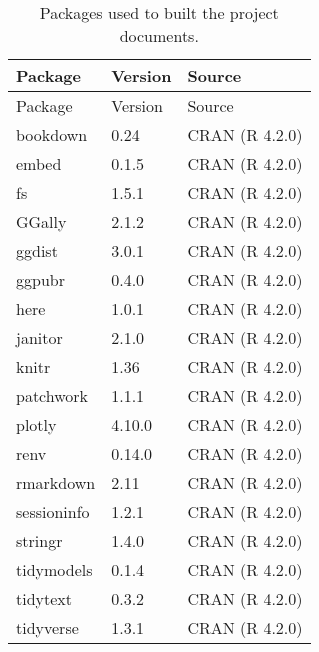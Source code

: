 \documentclass[
  12pt,
  a4paper,
  oneside]{krantz}
\begin{document}
\begin{longtable}[]{@{}lll@{}}
\caption{\label{tab:colophon}Packages used to built the project documents.}\tabularnewline
\toprule
Package & Version & Source\tabularnewline
\midrule
\endfirsthead
\toprule
Package & Version & Source\tabularnewline
\midrule
\endhead
bookdown & 0.24 & CRAN (R 4.2.0)\tabularnewline
embed & 0.1.5 & CRAN (R 4.2.0)\tabularnewline
fs & 1.5.1 & CRAN (R 4.2.0)\tabularnewline
GGally & 2.1.2 & CRAN (R 4.2.0)\tabularnewline
ggdist & 3.0.1 & CRAN (R 4.2.0)\tabularnewline
ggpubr & 0.4.0 & CRAN (R 4.2.0)\tabularnewline
here & 1.0.1 & CRAN (R 4.2.0)\tabularnewline
janitor & 2.1.0 & CRAN (R 4.2.0)\tabularnewline
knitr & 1.36 & CRAN (R 4.2.0)\tabularnewline
patchwork & 1.1.1 & CRAN (R 4.2.0)\tabularnewline
plotly & 4.10.0 & CRAN (R 4.2.0)\tabularnewline
renv & 0.14.0 & CRAN (R 4.2.0)\tabularnewline
rmarkdown & 2.11 & CRAN (R 4.2.0)\tabularnewline
sessioninfo & 1.2.1 & CRAN (R 4.2.0)\tabularnewline
stringr & 1.4.0 & CRAN (R 4.2.0)\tabularnewline
tidymodels & 0.1.4 & CRAN (R 4.2.0)\tabularnewline
tidytext & 0.3.2 & CRAN (R 4.2.0)\tabularnewline
tidyverse & 1.3.1 & CRAN (R 4.2.0)\tabularnewline
\bottomrule
\end{longtable}

\backmatter

  

\end{document}
